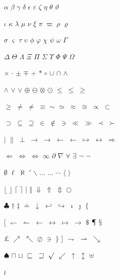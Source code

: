 \documentclass{article}
\begin{document}
$\alpha$ $\beta$ $\gamma$ $\delta$ $\epsilon$ $\varepsilon$ $\zeta$ $\eta$ $\theta$ $\vartheta$

$\iota$ $\kappa$ $\lambda$ $\mu$ $\nu$ $\xi$ $\pi$ $\varpi$ $\rho$ $\varrho$

$\sigma$ $\varsigma$ $\tau$ $\upsilon$ $\phi$ $\varphi$ $\chi$ $\psi$ $\omega$ $\Gamma$

$\Delta$ $\Theta$ $\Lambda$ $\Xi$ $\Pi$ $\Sigma$ $\Upsilon$ $\Phi$ $\Psi$ $\Omega$

$\times$ $\cdot$ $\pm$ $\mp$ $\div$ $\ast$ $\circ$ $\cup$ $\cap$ $\wedge$

$\land$ $\vee$ $\lor$ $\oplus$ $\ominus$ $\otimes$ $\odot$ $\le$ $\leq$ $\ge$

$\geq$ $\ne$ $\neq$ $\equiv$ $\sim$ $\simeq$ $\approx$ $\cong$ $\propto$ $\subset$

$\supset$ $\subseteq$ $\supseteq$ $\in$ $\notin$ $\ni$ $\ll$ $\gg$ $\prec$ $\succ$

$\mid$ $\parallel$ $\perp$ $\to$ $\rightarrow$ $\leftarrow$ $\gets$ $\mapsto$ $\leftrightarrow$ $\Rightarrow$

$\Leftarrow$ $\Leftrightarrow$ $\iff$ $\infty$ $\partial$ $\nabla$ $\forall$ $\exists$ $\neg$ $\lnot$

$\emptyset$ $\ell$ $\aleph$ $\prime$ $\backslash$ $\ldots$ $\dots$ $\cdots$ $\langle$ $\rangle$

$\lfloor$ $\rfloor$ $\lceil$ $\rceil$ $\vert$ $\Vert$ $\Downarrow$ $\Uparrow$ $\Updownarrow$ $\bigcirc$

$\clubsuit$ $\dagger$ $\ddagger$ $\doteq$ $\downarrow$ $\hookleftarrow$ $\hookrightarrow$ $\imath$ $\jmath$ $\lbrace$

$\lbrack$ $\leftharpoondown$ $\leftharpoonup$ $\longleftarrow$ $\longleftrightarrow$ $\longmapsto$ $\longrightarrow$ $\mathdollar$ $\mathparagraph$ $\mathsection$

$\mathsterling$ $\nearrow$ $\nwarrow$ $\oslash$ $\owns$ $\rbrace$ $\rbrack$ $\rightharpoondown$ $\rightharpoonup$ $\searrow$

$\spadesuit$ $\sqcap$ $\sqcup$ $\sqsubseteq$ $\sqsupseteq$ $\surd$ $\swarrow$ $\uparrow$ $\updownarrow$ $\uplus$

$\wr$
\end{document}
